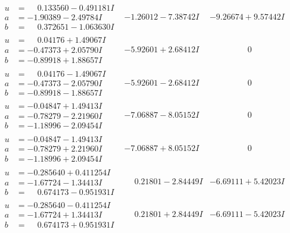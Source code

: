 \documentclass[1p]{elsarticle_modified}
\theoremstyle{definition}
\begin{document}
$$\begin{array}{c|c|c}
\begin{aligned}
u &= \phantom{-}0.133560 - 0.491181 I \\
a &= -1.90389 - 2.49784 I \\
b &= \phantom{-}0.372651 - 1.063630 I\end{aligned}
 & -1.26012 - 7.38742 I & -9.26674 + 9.57442 I \\ \hline\begin{aligned}
u &= \phantom{-}0.04176 + 1.49067 I \\
a &= -0.47373 + 2.05790 I \\
b &= -0.89918 + 1.88657 I\end{aligned}
 & -5.92601 + 2.68412 I & \phantom{-0.000000 } 0 \\ \hline\begin{aligned}
u &= \phantom{-}0.04176 - 1.49067 I \\
a &= -0.47373 - 2.05790 I \\
b &= -0.89918 - 1.88657 I\end{aligned}
 & -5.92601 - 2.68412 I & \phantom{-0.000000 } 0 \\ \hline\begin{aligned}
u &= -0.04847 + 1.49413 I \\
a &= -0.78279 - 2.21960 I \\
b &= -1.18996 - 2.09454 I\end{aligned}
 & -7.06887 - 8.05152 I & \phantom{-0.000000 } 0 \\ \hline\begin{aligned}
u &= -0.04847 - 1.49413 I \\
a &= -0.78279 + 2.21960 I \\
b &= -1.18996 + 2.09454 I\end{aligned}
 & -7.06887 + 8.05152 I & \phantom{-0.000000 } 0 \\ \hline\begin{aligned}
u &= -0.285640 + 0.411254 I \\
a &= -1.67724 - 1.34413 I \\
b &= \phantom{-}0.674173 - 0.951931 I\end{aligned}
 & \phantom{-}0.21801 - 2.84449 I & -6.69111 + 5.42023 I \\ \hline\begin{aligned}
u &= -0.285640 - 0.411254 I \\
a &= -1.67724 + 1.34413 I \\
b &= \phantom{-}0.674173 + 0.951931 I\end{aligned}
 & \phantom{-}0.21801 + 2.84449 I & -6.69111 - 5.42023 I\\

\end{array}$$
\end{document}
